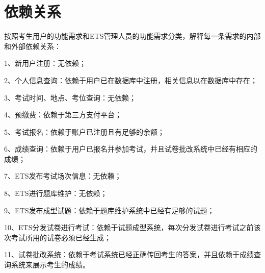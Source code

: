 \chapter{依赖关系}
按照考生用户的功能需求和ETS管理人员的功能需求分类，解释每一条需求的内部和外部依赖关系：

1、新用户注册：无依赖；

2、个人信息查询：依赖于用户已在数据库中注册，相关信息以在数据库中存在；

3、考试时间、地点、考位查询：无依赖；

4、预缴费：依赖于第三方支付平台；

5、考试报名：依赖于账户已注册且有足够的余额；

6、成绩查询：依赖于用户已报名并参加考试，并且试卷批改系统中已经有相应的成绩；

7、ETS发布考试场次信息：无依赖；

8、ETS进行题库维护：无依赖；

9、ETS发布成型试题：依赖于题库维护系统中已经有足够的试题；

10、ETS分发试卷进行考试：依赖于试题成型系统，每次分发试卷进行考试之前该次考试所用的试卷必须已经生成；

11、试卷批改系统：依赖于考试系统已经正确传回考生的答案，并且依赖于成绩查询系统来展示考生的成绩。
